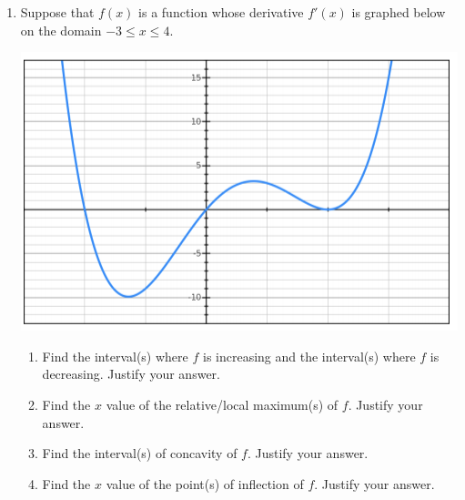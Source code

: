 \documentclass[letterpaper,12pt,fleqn]{article}
\begin{document}
\begin{enumerate}[left=0in]
  \newpage

\item Suppose that \(f(x)\) is a function whose derivative \(f'(x)\) is graphed below on the domain
  \(-3\leq x\leq 4\).

  \vspace{0.5in}

  \begin{center}
    \includegraphics{graph2}
  \end{center}

  \vspace{0.5in}

  \begin{enumerate}
  \item Find the interval(s) where \(f\) is increasing and the interval(s) where \(f\) is decreasing.  Justify
    your answer.

    \vspace{2in}
    
  \item Find the \(x\) value of the relative/local maximum(s) of \(f\).  Justify your answer.

    \newpage
    
  \item Find the interval(s) of concavity of \(f\).  Justify your answer.

    \vspace{3in}
    
  \item Find the \(x\) value of the point(s) of inflection of \(f\).  Justify your answer.
  \end{enumerate}
\end{enumerate}
\end{document}
